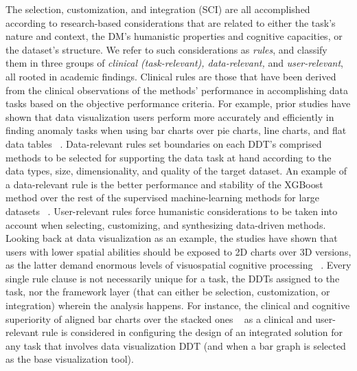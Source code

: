\documentclass{sfuthesis}
\begin{document}
The selection, customization, and integration (SCI) are all accomplished according to research-based considerations that are related to either the task’s nature and context, the DM’s humanistic properties and cognitive capacities, or the dataset’s structure. We refer to such considerations as \textit{rules}, and classify them in three groups of \textit{clinical (task-relevant), data-relevant,} and \textit{user-relevant}, all rooted in academic findings. Clinical rules are those that have been derived from the clinical observations of the methods’ performance in accomplishing data tasks based on the objective performance criteria. For example, prior studies have shown that data visualization users perform more accurately and efficiently in finding anomaly tasks when using bar charts over pie charts, line charts, and flat data tables ~\cite{saket2018task}. Data-relevant rules set boundaries on each DDT’s comprised methods to be selected for supporting the data task at hand according to the data types, size, dimensionality, and quality of the target dataset. An example of a data-relevant rule is the better performance and stability of the XGBoost method over the rest of the supervised machine-learning methods for large datasets ~\cite{cao2022systematic}. User-relevant rules force humanistic considerations to be taken into account when selecting, customizing, and synthesizing data-driven methods. Looking back at data visualization as an example, the studies have shown that users with lower spatial abilities should be exposed to 2D charts over 3D versions, as the latter demand enormous levels of visuospatial cognitive processing ~\cite{chikha2021effect}. Every single rule clause is not necessarily unique for a task, the DDTs assigned to the task, nor the framework layer (that can either be selection, customization, or integration) wherein the analysis happens. For instance, the clinical and cognitive superiority of aligned bar charts over the stacked ones ~\cite{talbot2014four, cleveland_graphical_1984} as a clinical and user-relevant rule is considered in configuring the design of an integrated solution for any task that involves data visualization DDT (and when a bar graph is selected as the base visualization tool).\par
\end{document}
